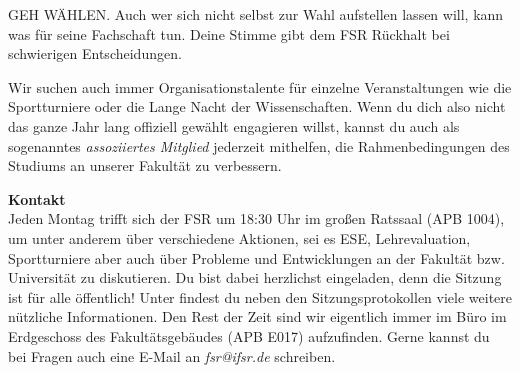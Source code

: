 GEH WÄHLEN.
Auch wer sich nicht selbst zur Wahl aufstellen lassen will, kann was für seine Fachschaft tun.
Deine Stimme gibt dem FSR Rückhalt bei schwierigen Entscheidungen.

Wir suchen auch immer Organisationstalente für einzelne Veranstaltungen wie die Sportturniere oder die Lange Nacht der Wissenschaften.
Wenn du dich also nicht das ganze Jahr lang offiziell gewählt engagieren willst, kannst du auch als sogenanntes \textit{assoziiertes Mitglied} jederzeit mithelfen, die Rahmenbedingungen des Studiums an unserer Fakultät zu verbessern.

\textbf{Kontakt} \\
Jeden Montag trifft sich der FSR um 18:30 Uhr im großen Ratssaal (APB 1004), um unter anderem über verschiedene Aktionen, sei es ESE, Lehrevaluation, Sportturniere aber auch über Probleme und Entwicklungen an der Fakultät bzw. Universität zu diskutieren.
Du bist dabei herzlichst eingeladen, denn die Sitzung ist für alle öffentlich! Unter  findest du neben den Sitzungsprotokollen viele weitere nützliche Informationen.
Den Rest der Zeit sind wir eigentlich immer im Büro im Erdgeschoss des Fakultätsgebäudes (APB E017) aufzufinden.
Gerne kannst du bei Fragen auch eine E-Mail an \textit{fsr@ifsr.de} schreiben.

\newpage
\mbox{}
\thispagestyle{empty}

